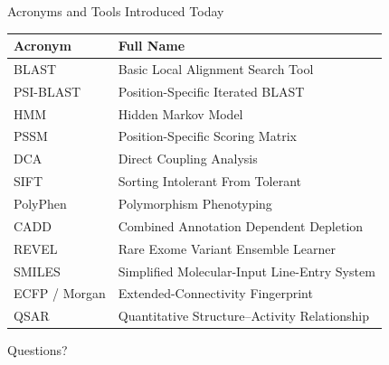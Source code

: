 \documentclass[aspectratio=169,10pt]{beamer}
\begin{document}
\begin{frame}{Acronyms and Tools Introduced Today}
\begin{center}
{\footnotesize
\renewcommand{\arraystretch}{1.05}
\begin{tabular}{ll}
\toprule
\textbf{Acronym} & \textbf{Full Name} \\
\midrule
BLAST & Basic Local Alignment Search Tool \\
PSI-BLAST & Position-Specific Iterated BLAST \\
HMM & Hidden Markov Model \\
PSSM & Position-Specific Scoring Matrix \\
DCA & Direct Coupling Analysis \\
SIFT & Sorting Intolerant From Tolerant \\
PolyPhen & Polymorphism Phenotyping \\
CADD & Combined Annotation Dependent Depletion \\
REVEL & Rare Exome Variant Ensemble Learner \\
SMILES & Simplified Molecular-Input Line-Entry System \\
ECFP / Morgan & Extended-Connectivity Fingerprint \\
QSAR & Quantitative Structure--Activity Relationship \\
\bottomrule
\end{tabular}
}
\end{center}
\end{frame}

\begin{frame}[standout]
    Questions?
\end{frame}
\end{document}
